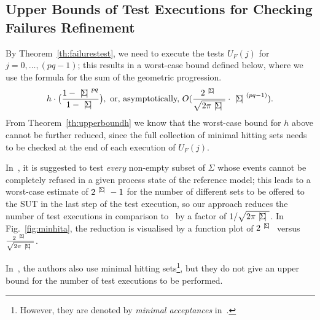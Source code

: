 \subsection{Upper Bounds of Test Executions for Checking Failures Refinement}

By Theorem~\ref{th:failurestest}, we need to execute the tests $U_F(j)$ for
$j = 0,\dots,(pq-1)$; this results in a worst-case bound defined below, where
we use the formula for the sum of the geometric progression.
%
\[
h\cdot \big( \frac{1-\card{\Sigma}^{pq}}{1-\card{\Sigma}} \big),\
 \text{or, asymptotically,}\  O(\frac{2^\card{\Sigma}}{\sqrt{2\pi \card{\Sigma}}}\cdot\card{\Sigma}^{(pq-1)}).
 \]
%
From Theorem~\ref{th:upperboundh} we know that the worst-case bound for $h$
above cannot be further reduced, since the full collection of minimal hitting
sets needs to be checked at the end of each execution of $U_F(j)$.

In~\cite{Hennessy:1988:ATP:50497}, it is suggested to test {\it every}
non-empty subset of $\Sigma$ whose events cannot be completely refused in a
given process state of the reference model; this leads to a worst-case
estimate of $2^{{~|\! \Sigma\!|~}}-1$ for the number of different sets to be
offered to the SUT in the last step of the test execution, so our approach
reduces the number of test executions in comparison
to~\cite{Hennessy:1988:ATP:50497} by a factor of $1/{\sqrt{2\pi
{~|\! \Sigma\!|~}}}$. In Fig.~\ref{fig:minhita}, the reduction is visualised by a
function plot of $2^{{~|\! \Sigma\!|~}}$ versus
$\frac{2^{~|\! \Sigma\!|~}}{\sqrt{2\pi {~|\! \Sigma\!|~}}}$.

In~\cite{DBLP:conf/icfem/CavalcantiG07}, the authors also use minimal hitting
sets\footnote{However, they are denoted by {\it minimal acceptances}
in~\cite{DBLP:conf/icfem/CavalcantiG07}.}, but they do not give an upper
bound for the number of test executions to be performed.

